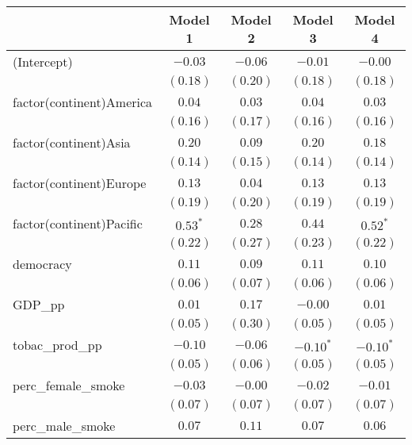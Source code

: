 
\begin{table}[!h]
\begin{center}
\begin{tabular}{l c c c c }
\toprule
 & Model 1 & Model 2 & Model 3 & Model 4 \\
\midrule
(Intercept)              & $-0.03$      & $-0.06$      & $-0.01$      & $-0.00$      \\
                         & $(0.18)$     & $(0.20)$     & $(0.18)$     & $(0.18)$     \\
factor(continent)America & $0.04$       & $0.03$       & $0.04$       & $0.03$       \\
                         & $(0.16)$     & $(0.17)$     & $(0.16)$     & $(0.16)$     \\
factor(continent)Asia    & $0.20$       & $0.09$       & $0.20$       & $0.18$       \\
                         & $(0.14)$     & $(0.15)$     & $(0.14)$     & $(0.14)$     \\
factor(continent)Europe  & $0.13$       & $0.04$       & $0.13$       & $0.13$       \\
                         & $(0.19)$     & $(0.20)$     & $(0.19)$     & $(0.19)$     \\
factor(continent)Pacific & $0.53^{*}$   & $0.28$       & $0.44$       & $0.52^{*}$   \\
                         & $(0.22)$     & $(0.27)$     & $(0.23)$     & $(0.22)$     \\
democracy                & $0.11$       & $0.09$       & $0.11$       & $0.10$       \\
                         & $(0.06)$     & $(0.07)$     & $(0.06)$     & $(0.06)$     \\
GDP\_pp                  & $0.01$       & $0.17$       & $-0.00$      & $0.01$       \\
                         & $(0.05)$     & $(0.30)$     & $(0.05)$     & $(0.05)$     \\
tobac\_prod\_pp          & $-0.10$      & $-0.06$      & $-0.10^{*}$  & $-0.10^{*}$  \\
                         & $(0.05)$     & $(0.06)$     & $(0.05)$     & $(0.05)$     \\
perc\_female\_smoke      & $-0.03$      & $-0.00$      & $-0.02$      & $-0.01$      \\
                         & $(0.07)$     & $(0.07)$     & $(0.07)$     & $(0.07)$     \\
perc\_male\_smoke        & $0.07$       & $0.11$       & $0.07$       & $0.06$       \\

\end{tabular}
\end{center}
\end{table}
